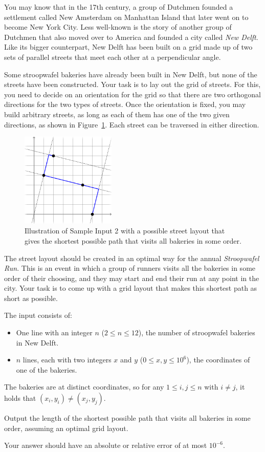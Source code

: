 
You may know that in the 17th century, a group of Dutchmen founded a settlement called New Amsterdam on Manhattan Island that later went on to become New York City.
Less well-known is the story of another group of Dutchmen that also moved over to America and founded a city called \emph{New Delft}.
Like its bigger counterpart, New Delft has been built on a grid made up of two sets of parallel streets that meet each other at a perpendicular angle.

Some stroopwafel bakeries have already been built in New Delft, but none of the streets have been constructed.
Your task is to lay out the grid of streets.
For this, you need to decide on an orientation for the grid so that there are two orthogonal directions for the two types of streets.
Once the orientation is fixed, you may build arbitrary streets, as long as each of them has one of the two given directions, as shown in Figure~\ref{fig:tour}.
Each street can be traversed in either direction.

\begin{figure}[!h]
  \centering
  \includegraphics[width=0.4\textwidth]{sample2.pdf}
  \caption{Illustration of Sample Input 2 with a possible street layout that gives the shortest possible path that visits all bakeries in some order.}
  \label{fig:tour}
\end{figure}

The street layout should be created in an optimal way for the annual \emph{Stroopwafel Run}.
This is an event in which a group of runners visits all the bakeries in some order of their choosing, and they may start and end their run at any point in the city.
Your task is to come up with a grid layout that makes this shortest path as short as possible.

\begin{Input}
  The input consists of:
  \begin{itemize}
    \item One line with an integer $n$ ($2 \le n \le 12$), the number of stroopwafel bakeries in New Delft.
    \item $n$ lines, each with two integers $x$ and $y$ ($0 \le x,y \le 10^6$), the coordinates of one of the bakeries.
  \end{itemize}
  The bakeries are at distinct coordinates, so for any $1 \le i,j \le n$ with $i \neq j$, it holds that $(x_i, y_i) \neq (x_j, y_j)$.
\end{Input}

\begin{Output}
  Output the length of the shortest possible path that visits all bakeries in some order, assuming an optimal grid layout.

  Your answer should have an absolute or relative error of at most $10^{-6}$.
\end{Output}
